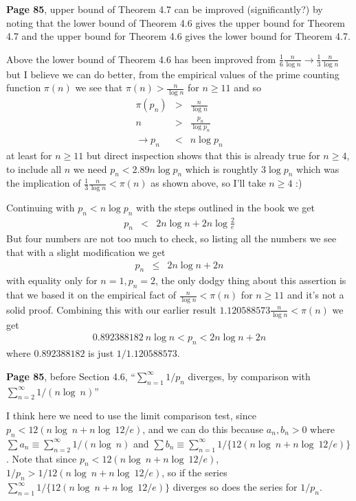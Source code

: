 \documentclass[aps,preprint,preprintnumbers,nofootinbib,showpacs,prd]{revtex4-1}
\newcommand{\nbea}{\begin{eqnarray*}}
\newcommand{\neea}{\end{eqnarray*}}
\begin{document}
{\bf Page 85}, upper bound of Theorem 4.7 can be improved (significantly?) by noting that the lower bound of Theorem 4.6 gives the upper bound for Theorem 4.7 and the upper bound for Theorem 4.6 gives the lower bound for Theorem 4.7.

Above the lower bound of Theorem 4.6 has been improved from $\frac{1}{6}\frac{n}{\log n} \to \frac{1}{3}\frac{n}{\log n}$ but I believe we can do better, from the empirical values of the prime counting function $\pi(n)$ we see that $\pi(n) > \frac{n}{\log n}$ for $n \ge 11$ and so
%
\nbea
\pi(p_n) & > & \frac{n}{\log n} \\
n & > & \frac{p_n}{\log p_n} \\
\to p_n & < & n \log p_n
\neea
%
at least for $n \ge 11$ but direct inspection shows that this is already true for $n \ge 4$, to include all $n$ we need $p_n < 2.89 n\log p_n$ which is roughtly $3\log p_n$ which was the implication of $\frac{1}{3}\frac{n}{\log n} < \pi(n)$ as shown above, so I'll take $n \ge 4$ :) 

Continuing with $p_n < n\log p_n$ with the steps outlined in the book we get
%
\nbea
p_n & < & 2n\log n + 2 n\log\frac{2}{e}
\neea
%
But four numbers are not too much to check, so listing all the numbers we see that with a slight modification we get
%
\nbea
p_n & \le & 2n\log n + 2n
\neea
%
with equality only for $n=1, p_n=2$, the only dodgy thing about this assertion is that we based it on the empirical fact of $\frac{n}{\log n}< \pi(n)$ for $n \ge 11$ and it's not a solid proof. Combining this with our earlier result $1.120588573 \frac{n}{\log n}<\pi(n)$ we get
%
\nbea
0.892388182 ~ n\log n < p_n < 2n\log n + 2n
\neea
%
where $0.892388182$ is just $1/1.120588573$.

{\bf Page 85}, before Section 4.6, ``$\sum_{n=1}^{\infty} 1/p_n$ diverges, by comparison with $\sum_{n=2}^{\infty}1/(n\log~n)$''

I think here we need to use the limit comparison test, since $p_n < 12(n\log~n + n\log~12/e)$, and we can do this because $a_n, b_n > 0$ where $\sum a_n \equiv \sum_{n=2}^{\infty} 1/(n \log~n)$ and $\sum b_n \equiv \sum_{n=1}^{\infty}1/\{12(n\log~n + n\log~12/e)\}$. Note that since $p_n < 12(n\log~n + n\log~12/e)$, $1/p_n > 1/12(n\log~n + n\log~12/e)$, so if the series $\sum_{n=1}^{\infty}1/\{12(n\log~n + n\log~12/e)\}$ diverges so does the series for $1/p_n$.
\end{document}
